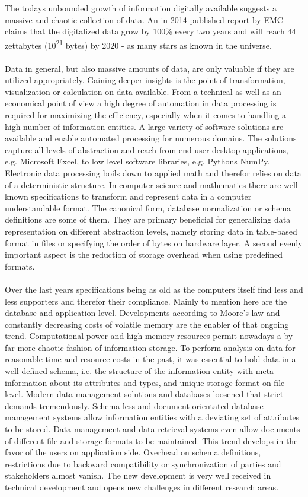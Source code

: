 The todays unbounded growth of information digitally available suggests a massive and chaotic collection of data. An in 2014 published report by EMC claims that the digitalized data grow by 100\% every two years and will reach 44 zettabytes (10\textsuperscript{21} bytes) by 2020 - as many stars as known in the universe. 
\\\\
Data in general, but also massive amounts of data, are only valuable if they are utilized appropriately. Gaining deeper insights is the point of transformation, visualization or calculation on data available. From a technical as well as an economical point of view a high degree of automation in data processing is required for maximizing the efficiency, especially when it comes to handling a high number of information entities. A large variety of software solutions are available and enable automated processing for numerous domains. The solutions capture all levels of abstraction and reach from end user desktop applications, e.g. Microsoft Excel, to low level software libraries, e.g. Pythons NumPy. Electronic data processing boils down to applied math and therefor relies on data of a deterministic structure. In computer science and mathematics there are well known specifications to transform and represent data in a computer understandable format. The canonical form, database normalization or schema definitions are some of them. They are primary beneficial for generalizing data representation on different abstraction levels, namely storing data in table-based format in files or specifying the order of bytes on hardware layer. A second evenly important aspect is the reduction of storage overhead when using predefined formats.
\\\\
Over the last years specifications being as old as the computers itself find less and less supporters and therefor their compliance. Mainly to mention here are the database and application level. Developments according to Moore's law and constantly decreasing  costs of volatile memory are the enabler of that ongoing trend. Computational power and high memory resources permit nowadays a by far more chaotic fashion of information storage. To perform analysis on data for reasonable time and resource costs in the past, it was essential to hold data in a well defined schema, i.e. the structure of the information entity with meta information about its attributes and types, and unique storage format on file level. Modern data management solutions and databases loosened that strict demands tremendously. Schema-less and document-orientated database management systems allow information entities with a deviating set of attributes to be stored. Data management and data retrieval systems even allow documents of different file and storage formats to be maintained. This trend develops in the favor of the users on application side. Overhead on schema definitions, restrictions due to backward compatibility or synchronization of parties and stakeholders almost vanish. The new development is very well received in technical development and opens new challenges in different research areas.
